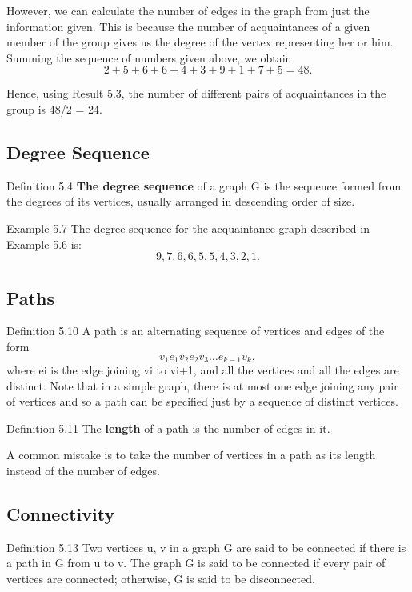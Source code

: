 \documentclass{article}
\begin{document}
However, we can calculate the number of
edges in the graph from just the information given. This is because the number of acquaintances
of a given member of the group gives us the degree of the vertex representing her or him. Summing
the sequence of numbers given above, we obtain
\[2 + 5 + 6 + 6 + 4 + 3 + 9 + 1 + 7 + 5 = 48.\]

Hence, using Result 5.3, the number of different pairs of acquaintances in the group is 48/2 = 24.

\subsection*{Degree Sequence}
Definition 5.4 \textbf{The degree sequence }of a graph G is the sequence formed from the degrees of its
vertices, usually arranged in descending order of size.

Example 5.7 The degree sequence for the acquaintance graph described in Example 5.6 is:
\[9, 7, 6, 6, 5, 5, 4, 3, 2, 1.\]

\subsection*{ Paths }

Definition 5.10 A path is an alternating sequence of vertices and edges of the form 
                                  \[v_1 e_1v_2 e_2v_3 \ldots e_{k-1}v_k,\] 
where ei is the edge joining vi to vi+1, and all the vertices and all the edges are distinct. Note that in a simple graph, there is at most one edge joining any pair of vertices and so a path can be specified just by a sequence of distinct vertices.

Definition 5.11 The \textbf{length} of a path is the number of edges in it.

A common mistake is to take the number of vertices in a path as its length instead of the number of edges.


\subsection*{Connectivity}

Definition 5.13 Two vertices u, v in a graph G are said to be connected if there is a 
path in G from u to v. The graph G is said to be connected if every pair of vertices are 
connected; otherwise, G is said to be disconnected.
\end{document}
